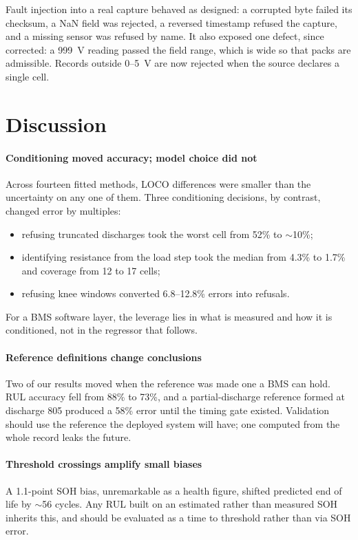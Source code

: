 \documentclass[preprint,12pt,authoryear]{elsarticle}
\begin{document}
Fault injection into a real capture behaved as designed: a corrupted byte failed
its checksum, a NaN field was rejected, a reversed timestamp refused the
capture, and a missing sensor was refused by name. It also exposed one defect,
since corrected: a 999~V reading passed the field range, which is wide so that
packs are admissible. Records outside 0--5~V are now rejected when the source
declares a single cell.

\section{Discussion}
\label{sec:discussion}

\paragraph{Conditioning moved accuracy; model choice did not}
Across fourteen fitted methods, LOCO differences were smaller than the
uncertainty on any one of them. Three conditioning decisions, by contrast,
changed error by multiples:
\begin{itemize}
\item refusing truncated discharges took the worst cell from 52\% to
${\sim}$10\%;
\item identifying resistance from the load step took the median from 4.3\% to
1.7\% and coverage from 12 to 17 cells;
\item refusing knee windows converted 6.8--12.8\% errors into refusals.
\end{itemize}
For a BMS software layer, the leverage lies in what is measured and how it is
conditioned, not in the regressor that follows.

\paragraph{Reference definitions change conclusions}
Two of our results moved when the reference was made one a BMS can hold. RUL
accuracy fell from 88\% to 73\%, and a partial-discharge reference formed at
discharge 805 produced a 58\% error until the timing gate existed. Validation
should use the reference the deployed system will have; one computed from the
whole record leaks the future.

\paragraph{Threshold crossings amplify small biases}
A 1.1-point SOH bias, unremarkable as a health figure, shifted predicted end of
life by ${\sim}$56 cycles. Any RUL built on an estimated rather than measured SOH
inherits this, and should be evaluated as a time to threshold rather than via
SOH error.
\end{document}
